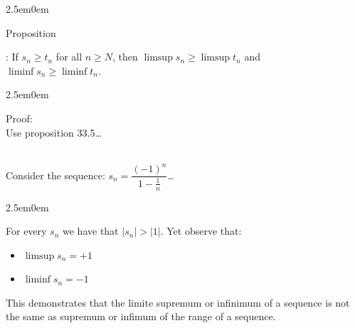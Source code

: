 \documentclass{book}
\newcommand{\hTwo}{%
   \color{MidnightBlue}%
   \fontsize{13}{15}\selectfont%
}
\newcommand{\hThree}{%
   \color{PineGreen}
   \fontsize{13}{15}\selectfont%
}
\newcommand{\exOne}{%
   \color{Purple}%
   \fontsize{14}{16}\selectfont%
}
\newcommand{\exTwo}{%
   \color{RedViolet}%
   \fontsize{13}{15}\selectfont%
}
\newenvironment{myIndent}{%
   \begin{adjustwidth}{2.5em}{0em}%
}{%
   \end{adjustwidth}%
}
\newcommand{\retTwo}{\hfill\bigbreak}
\newcounter{PropNumber}
\newcommand{\propCount}[1][1]{%
   \addtocounter{PropNumber}{#1}%
   \thePropNumber%
}
\newcommand{\mySepTwo}[1][.]{%
   {\noindent\color{#1}{\rule{6.5in}{0.5mm}}}\\%
}
\begin{document}
   \newpage

   {\begin{myIndent} \hTwo
      Proposition \propCount: If $s_n \geq t_n$ for all $n \geq N$, then $\limsup{s_n} \geq \limsup{t_n}$ and\\ $\liminf{s_n} \geq \liminf{t_n}$.

      {\begin{myIndent}\hThree
         Proof:\\
         Use proposition 33.5\dots \retTwo
      \end{myIndent}}
   \end{myIndent}}

   \exOne
   \mySepTwo

   Consider the sequence: $s_n = \dfrac{(-1)^n}{1 - \frac{1}{n}}$\dots\\
   {\begin{myIndent} \exTwo
      For every $s_n$ we have that $|s_n| > |1|$. Yet observe that:
      \begin{itemize}
         \item $\limsup{s_n} = +1$
         \item $\liminf{s_n} = -1$
      \end{itemize}
      This demonstrates that the limite supremum or infinimum of a sequence is not the same as supremum or infimum of the range of a sequence.
   \end{myIndent}}

   \mySepTwo
   
\end{document}
